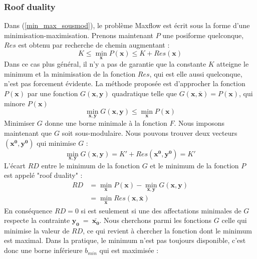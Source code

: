 \documentclass[../main/These_Mathias_Paget.tex]{subfiles}
\begin{document}
	\subsubsection{Roof duality}
	Dans (\ref{min_max_sousmod}), le problème Maxflow est écrit sous la forme d'une minimisation-maximisation. Prenons maintenant $P$ une posiforme quelconque, $Res$ est obtenu par recherche de chemin augmentant :
	\begin{equation}
		\label{min_max_sousmod2}
			K \leq \min_{\boldsymbol{x}}{P(\boldsymbol{x})} \leq K + Res(\boldsymbol{x})
	\end{equation}
	Dans ce cas plus général, il n'y a pas de garantie que la constante $K$ atteigne le minimum et la minimisation de la fonction $Res$, qui est elle aussi quelconque, n'est pas forcement évidente. La méthode proposée est d'approcher la fonction $P(\boldsymbol{x})$ par une fonction $G(\boldsymbol{x},\boldsymbol{y})$ quadratique telle que $G(\boldsymbol{x},\bar{\boldsymbol{x}})=P(\boldsymbol{x})$, qui minore $P(\boldsymbol{x})$
	\begin{equation}
	\label{graph:interval}
		\min_{\boldsymbol{x},\boldsymbol{y}}{G(\boldsymbol{x},\boldsymbol{y})} \leq  \min_{\boldsymbol{x}}{P(\boldsymbol{x})}
	\end{equation} 
	Minimiser $G$ donne une borne minimale à la fonction $F$. Nous imposons maintenant que $G$ soit sous-modulaire. Nous pouvons trouver deux vecteurs $(\boldsymbol{x^0},\boldsymbol{y^0})$ qui minimise $G$ :
	\begin{equation}
		\min_{\boldsymbol{x},\boldsymbol{y}}{G(\boldsymbol{x},\boldsymbol{y})} = K' + Res(\boldsymbol{x^0},\boldsymbol{y^0}) = K'
	\end{equation}
	L'écart $RD$ entre le minimum de la fonction $G$ et le minimum de la fonction $P$ est appelé "roof duality" :
	\begin{equation}
	\begin{aligned}
		RD &= \min_{\boldsymbol{x}}{P(\boldsymbol{x})}-\min_{\boldsymbol{x},\boldsymbol{y}}{G(\boldsymbol{x},\boldsymbol{y})} \\
		&= \min_{\boldsymbol{x}}{Res(\boldsymbol{x},\boldsymbol{\bar{x}})}
	\end{aligned}
	\end{equation}
En conséquence $RD=0$ si est seulement si une des affectations minimales de $G$ respecte la contrainte $\boldsymbol{y_0}~=~\boldsymbol{\bar{x_0}}$. Nous cherchons parmi les fonctions $G$ celle qui minimise la valeur de $RD$, ce qui revient à chercher la fonction dont le minimum est maximal. Dans la pratique, le minimum n'est pas toujours disponible, c'est donc une borne inférieure $b_{min}$ qui est maximisée :
\end{document}
